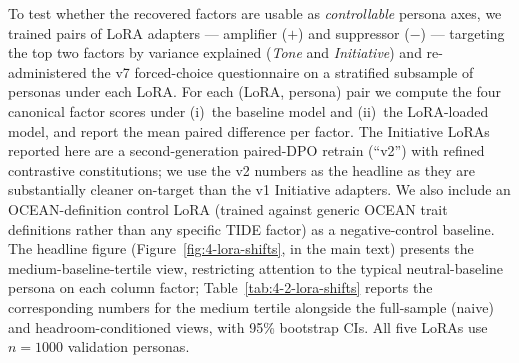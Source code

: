 To test whether the recovered factors are usable as \emph{controllable} persona axes, we trained pairs of LoRA adapters --- amplifier ($+$) and suppressor ($-$) --- targeting the top two factors by variance explained (\textit{Tone} and \textit{Initiative}) and re-administered the v7 forced-choice questionnaire on a stratified subsample of personas under each LoRA.
For each (LoRA, persona) pair we compute the four canonical factor scores under (i)~the baseline model and (ii)~the LoRA-loaded model, and report the mean paired difference per factor.
The Initiative LoRAs reported here are a second-generation paired-DPO retrain (``v2'') with refined contrastive constitutions; we use the v2 numbers as the headline as they are substantially cleaner on-target than the v1 Initiative adapters.
We also include an OCEAN-definition control LoRA (trained against generic OCEAN trait definitions rather than any specific TIDE factor) as a negative-control baseline.
The headline figure (Figure~\ref{fig:4-lora-shifts}, in the main text) presents the medium-baseline-tertile view, restricting attention to the typical neutral-baseline persona on each column factor; Table~\ref{tab:4-2-lora-shifts} reports the corresponding numbers for the medium tertile alongside the full-sample (naive) and headroom-conditioned views, with 95\% bootstrap CIs.
All five LoRAs use $n=1000$ validation personas.

